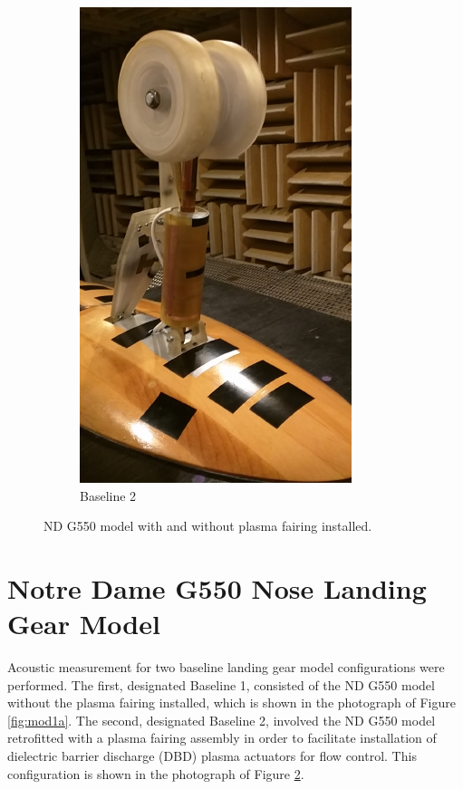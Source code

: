 \begin{figure}
\begin{center}
\begin{subfigure}{0.45\textwidth}
\includegraphics[width=\linewidth]{figures/model1b}
\caption{Baseline 2}
\label{fig:mod1b}
\end{subfigure}
\caption{ND G550 model with and without plasma fairing installed.}
\end{center}
\end{figure}

\section{Notre Dame G550 Nose Landing Gear Model}
Acoustic measurement for two baseline landing gear model configurations were performed. The first, designated Baseline 1, consisted of the ND G550 model without the plasma fairing installed, which is shown in the photograph of Figure \ref{fig:mod1a}. The second, designated Baseline 2, involved the ND G550 model retrofitted with a plasma fairing assembly in order to facilitate installation of dielectric barrier discharge (DBD) plasma actuators for flow control. This configuration is shown in the photograph of Figure \ref{fig:mod1b}.

